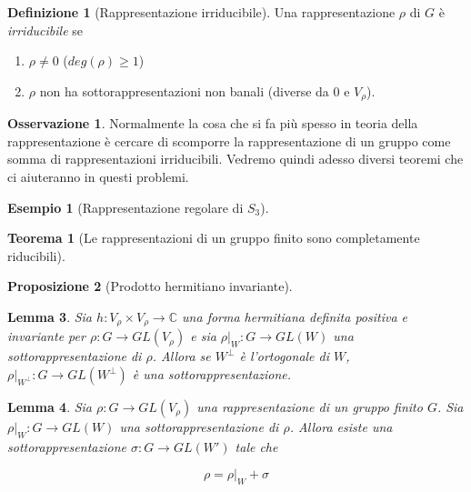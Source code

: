 \documentclass[11pt]{article}
\theoremstyle{plain}
\newtheorem{thm}{Teorema}[section]
\newtheorem{lemma}[thm]{Lemma}
\newtheorem{prop}[thm]{Proposizione}
\theoremstyle{definition}
\newtheorem{defn}{Definizione}[section]
\newtheorem{exmp}{Esempio}[section]
\newtheorem*{rem}{Osservazione}
\theoremstyle{remark}
\newcommand{\C}{\mathbb{C}}
\begin{document}
\begin{defn}[Rappresentazione irriducibile]
Una rappresentazione $\rho$ di $G$ è \textit{irriducibile} se
\begin{enumerate}
	\item $\rho \neq 0$ ($deg(\rho) \geq 1$)
	\item $\rho$ non ha sottorappresentazioni non banali (diverse da 0 e $V_{\rho}$).
\end{enumerate}

\end{defn}

\begin{rem} Normalmente la cosa che si fa più spesso in teoria della rappresentazione è cercare di scomporre la rappresentazione di un gruppo come somma di rappresentazioni irriducibili. Vedremo quindi adesso diversi teoremi che ci aiuteranno in questi problemi.

\end{rem}



\begin{exmp}[Rappresentazione regolare di $S_3$]


\end{exmp}



\begin{thm}[Le rappresentazioni di un gruppo finito sono completamente riducibili]

\end{thm}

\begin{prop}[Prodotto hermitiano invariante]

\end{prop}


\begin{lemma}
Sia $h: V_\rho \times V_\rho \to \C$ una forma hermitiana definita positiva e invariante per $\rho: G \to GL(V_\rho)$ e sia $\rho|_W: G \to GL(W)$ una sottorappresentazione di $\rho$. Allora se $W^\perp$ è l'ortogonale di $W$, $\rho|_{W^\perp}: G \to GL(W^\perp)$ è una sottorappresentazione.




\end{lemma}






\begin{lemma}
Sia $\rho: G \to GL(V_\rho)$ una rappresentazione di un gruppo finito $G$. Sia $\rho|_W: G \to GL(W)$ una sottorappresentazione di $\rho$. Allora esiste una sottorappresentazione $\sigma: G \to GL(W')$ tale che

\[\rho = \rho|_W + \sigma \]
\end{lemma}
\end{document}

